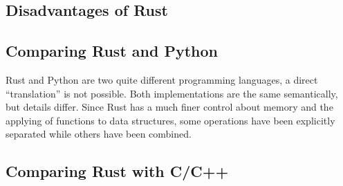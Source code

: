 \subsection{Disadvantages of Rust}







\subsection{Comparing Rust and Python}\label{sec:rustvspython}

Rust and Python are two quite different programming languages, a direct
``translation'' is not possible. Both implementations are the same semantically,
but details differ. Since Rust has a much finer control about memory and the
applying of functions to data structures, some operations have been explicitly
separated while others have been combined.

\subsection{Comparing Rust with C/C++}\label{sec:rustvscc++}








